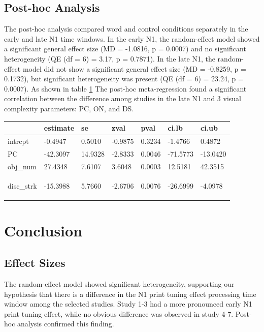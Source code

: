 \documentclass{article}
\begin{document}
\subsection{Post-hoc Analysis}

The post-hoc analysis compared word and control conditions separately in the early and late N1 time windows. In the early N1, the random-effect model showed a significant general effect size (MD = -1.0816, p = 0.0007) and no significant heterogeneity (QE (df = 6) = 3.17, p = 0.7871). In the late N1, the random-effect model did not show a significant general effect size (MD = -0.8259, p = 0.1732), but significant heterogeneity was present (QE (df = 6) = 23.24, p = 0.0007). As shown in table \ref{table2} The post-hoc meta-regression found a significant correlation between the difference among studies in the late N1 and 3 visual complexity parameters: PC, ON, and DS.

\begin{table}[h]
\centering
\begin{tabular}{@{}lllllll@{}}
           & estimate & se      & zval    & pval   & ci.lb    & ci.ub    \\ \midrule
intrcpt    & -0.4947  & 0.5010  & -0.9875 & 0.3234 & -1.4766  & 0.4872   \\
PC         & -42.3097 & 14.9328 & -2.8333 & 0.0046 & -71.5773 & -13.0420 \\
obj\_num   & 27.4348  & 7.6107  & 3.6048  & 0.0003 & 12.5181  & 42.3515  \\
disc\_strk & -15.3988 & 5.7660  & -2.6706 & 0.0076 & -26.6999 & -4.0978 

\label{table2}
\end{tabular}
\end{table}

\section{Conclusion}
\subsection{Effect Sizes}

The random-effect model showed significant heterogeneity, supporting our hypothesis that there is a difference in the N1 print tuning effect processing time window among the selected studies. Study 1-3 had a more pronounced early N1 print tuning effect, while no obvious difference was observed in study 4-7. Post-hoc analysis confirmed this finding.
\end{document}
